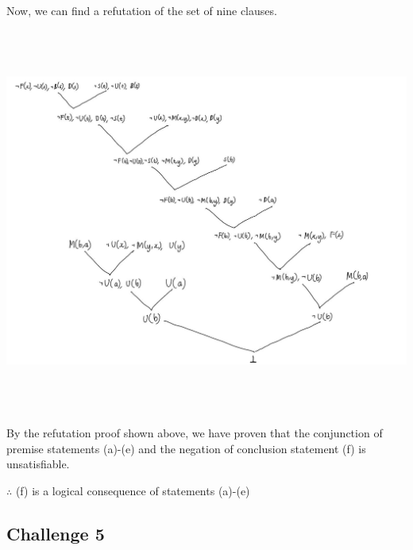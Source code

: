 \documentclass[12pt]{article}
\begin{document}
\bigskip
\noindent
Now, we can find a refutation of the set of nine clauses.

\begin{center}
\includegraphics[width=6in,height=5in,keepaspectratio]{q4_refutation.jpg}
\end{center}

\bigskip
\noindent
By the refutation proof shown above, we have proven that the conjunction of
premise statements (a)-(e) and the negation of conclusion statement (f) is
unsatisfiable. 

\bigskip
\noindent
$\therefore$ (f) is a logical consequence of statements (a)-(e)



\subsection*{Challenge 5}
\end{document}
